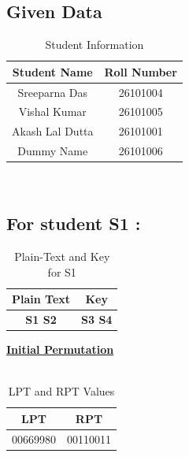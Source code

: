 \documentclass[12pt, letterpaper]{article}
\begin{document}
\subsection{Given Data}

\begin{table}[h]
    \centering
    \begin{tabular}{|c|c|}
        \hline
        \textbf{Student Name} & \textbf{Roll Number} \\
        \hline
        Sreeparna Das & 26101004 \\
        \hline
        Vishal Kumar & 26101005 \\
        \hline
        Akash Lal Dutta & 26101001 \\
        \hline
        Dummy Name & 26101006 \\
        \hline
    \end{tabular}
    \caption{Student Information}
    \label{tab:student-info}
\end{table} \\



\subsection{{For student S1 :}}

\begin{table}[h]
    \centering
    \begin{tabular}{|c|c|}
        \hline
          Plain Text & Key \\
        \hline
        \textbf{S1 S2} & \textbf{S3 S4} \\
        \hline
    \end{tabular}
    \caption{Plain-Text and Key for S1}
    \label{tab:text-key}
\end{table}






\underline{\textbf{Initial Permutation}} \\
\\
\begin{table}[h]
    \centering
    \begin{tabular}{|c|c|}
        
        \hline
        LPT & RPT \\
        \hline
        00669980 & 00110011   \\
        \hline
    \end{tabular}
    \caption{LPT and RPT Values}
    \label{tab:lpt-rpt}
\end{table}
\end{document}
